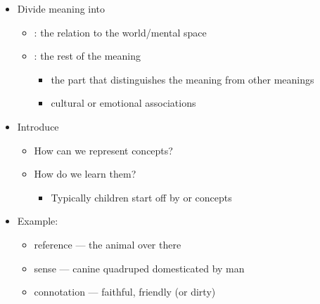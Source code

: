 \documentclass[a4paper,landscape,headrule,footrule,xetex]{foils}
\begin{document}

\begin{itemize}\addtolength{\itemsep}{-1ex}
\item Divide meaning into
  \begin{itemize}
  \item {}: the relation to the world/mental space
  \item {}: the rest of the meaning
    \begin{itemize}
    \item {} the part that distinguishes the meaning
      from other meanings
    \item {}  cultural or emotional associations 
    \end{itemize}
  \end{itemize}
\item Introduce  %
  \begin{itemize}
  \item How can we represent concepts?
  \item How do we learn them?
    \begin{itemize}
    \item Typically children start off by  or  concepts
    \end{itemize}
  \end{itemize}
\item Example: 
  \begin{itemize}
  \item reference --- the animal over there
  \item sense --- canine quadruped domesticated by man
  \item connotation --- faithful, friendly (or dirty)
  \end{itemize}
\end{itemize}




\end{document}
